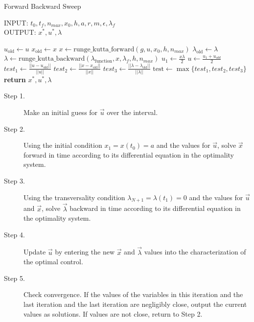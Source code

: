 \begin{algorithm}
	\caption{Forward Backward Sweep } \label{}
    INPUT: $t_0, t_f, n_{max}, x_0,h, a, r, m, \epsilon, \lambda_{f}$ \\
    OUTPUT: $x^*, u^*, \lambda$ \\
	\begin{algorithmic}[1]
				\State $u_{\text{old}} \gets u$ 
                \State $x_{\text{old}} \gets x$ 
                \State $ x \gets \text{runge\_kutta\_forward}(g, u, x_0, h,
                n_{max})$
                \State $\lambda_{\text{old}} \gets \lambda $
				\State $\lambda \gets \text{runge\_kutta\_backward}
                (\lambda_{\text{function}}, x, \lambda_f, h, n_{max})$
                \State $\displaystyle u_1 \gets \frac{x \lambda}{2}$
                \State $\displaystyle u \gets \frac{u_1 + u_{old}}{2}$
                \State $test_1 \gets \displaystyle 
                \frac{||u - u_{\text{old}}||}{||u||}$
                \State $test_2 \gets \displaystyle 
                \frac{||x - x_{\text{old}}||}{||x||}$
                \State $test_3 \gets \displaystyle 
                \frac{||\lambda - \lambda_{\text{old}}||}{||\lambda||}$
                \State $\text{test} \gets \max{ \{ test_1, test_2, test_3 \}}$
			\EndWhile\label{}
			\State \textbf{return} $ x^*, u^*, \lambda$
		\EndProcedure
	\end{algorithmic}
\end{algorithm}


\begin{description}
	\item[Step 1.]
    	Make an initial guess for $\vec{u}$ over the interval.
    \item[Step 2.]
    	Using the initial condition $x_1 = x(t_0) = a$ and the values for 
        $\vec{u}$, solve $\vec{x}$ forward in time according to its differential
        equation in the optimality system.
	\item[Step 3.]
    	Using the transversality condition $\lambda_{N+1} = \lambda(t_1) = 0$ 
        and the values for $\vec{u}$ and $\vec{x}$, solve $\vec{\lambda}$ 
        backward in time according to its differential equation in the optimality
        system.
    \item[Step 4.]
    	Update $\vec{u}$ by entering the new $\vec{x}$ and $\vec{\lambda}$ values 
        into the characterization of the optimal control. 
	\item[Step 5.]
    	Check convergence. If the values of the variables in this iteration and 
        the last iteration and the last iteration are negligibly close, output the 
        current values as solutions. If values are not close, return to Step 2.
\end{description}






